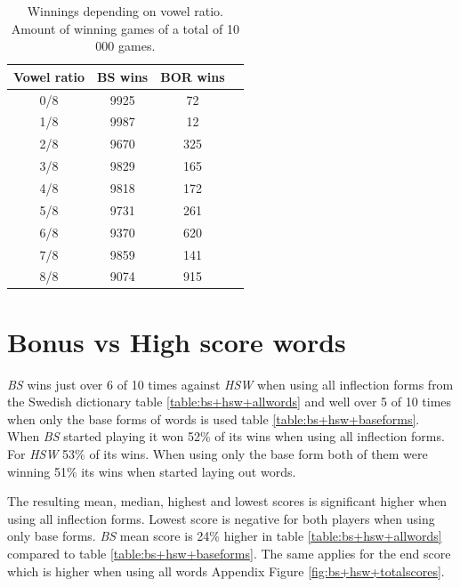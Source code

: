 \documentclass[a4paper, 12pt]{report}
\begin{document}
\begin{table}[h]
\centering
    \begin{tabular}{ | c | c | c |  p{5cm} |}
    \hline
   	Vowel ratio & BS wins & BOR wins \\ \hline
	0/8 & 9925 & 72 \\ \hline
    	1/8 & 9987 & 12 \\ \hline
    	2/8 & 9670 & 325 \\ \hline
    	3/8 & 9829 & 165 \\ \hline
	4/8 & 9818 & 172 \\ \hline
	5/8 & 9731 & 261 \\ \hline
	6/8 & 9370 & 620 \\ \hline
	7/8 & 9859 & 141 \\ \hline
	8/8 & 9074 & 915 \\ \hline
    \end{tabular}
\caption{Winnings depending on vowel ratio. Amount of winning games of a total of 10 000 games.}
\label{tab:bor+bs}
\end{table}




\section{Bonus vs High score words}
\label{sec:bonusHigh}
\emph{BS} wins just over 6 of 10 times against \emph{HSW} when using all inflection forms from the Swedish dictionary table \ref{table:bs+hsw+allwords} and well over 5 of 10 times when only the base forms of words is used table \ref{table:bs+hsw+baseforms}. When \emph{BS} started playing it won 52\% of its wins when using all inflection forms. For \emph{HSW} 53\% of its wins. When using only the base form both of them were winning 51\% its wins when started laying out words.

The resulting mean, median, highest and lowest scores is significant higher when using all inflection forms. Lowest score is negative for both players when using only base forms. \emph{BS} mean score is 24\% higher in table \ref{table:bs+hsw+allwords} compared to table \ref{table:bs+hsw+baseforms}. The same applies for the end score which is higher when using all words Appendix Figure \ref{fig:bs+hsw+totalscores}.
\end{document}
